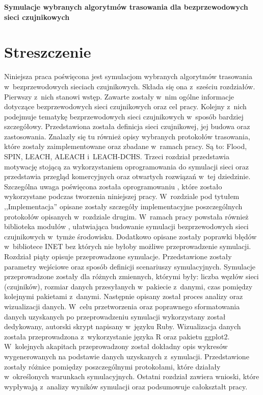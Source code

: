 \newpage
\begin{center}
\large \bf
Symulacje wybranych algorytmów trasowania dla bezprzewodowych sieci czujnikowych
\end{center}

\section*{Streszczenie}
Niniejsza praca poświęcona jest symulacjom wybranych algorytmów trasowania w~bezprzewodowych sieciach czujnikowych. Składa się ona z~sześciu rozdziałów. Pierwszy z~nich stanowi wstęp. Zawarte zostały w~nim ogólne informacje dotyczące bezprzewodowych sieci czujnikowych oraz cel pracy. Kolejny z~nich podejmuje tematykę bezprzewodowych sieci czujnikowych w~sposób bardziej szczegółowy. Przedstawiona została definicja sieci czujnikowej, jej budowa oraz zastosowania. Znalazły się tu również opisy wybranych protokołów trasowania, które zostały zaimplementowane oraz zbadane w~ramach pracy. Są to: Flood, SPIN, LEACH, ALEACH i~LEACH-DCHS. Trzeci rozdział przedstawia motywację stojącą za wykorzystaniem oprogramowania do symulacji sieci oraz przedstawia przegląd komercyjnych oraz otwartych rozwiązań w~tej dziedzinie. Szczególna uwaga poświęcona została oprogramowaniu \omnetpp, które zostało wykorzystane podczas tworzenia niniejszej pracy. W~rozdziale pod tytułem ,,Implementacja'' opisane zostały szczegóły implementacyjne poszczególnych protokołów opisanych w~rozdziale drugim. W~ramach pracy powstała również biblioteka modułów \omenetpp, ułatwiająca budowanie symulacji bezprzewodowych sieci czujnikowych w~tymże środowisku. Dodatkowo opisane zostały poprawki błędów w~bibliotece INET bez których nie byłoby możliwe przeprowadzenie symulacji. Rozdział piąty opisuje przeprowadzone symulacje. Przedstawione zostały parametry wejściowe oraz sposób definicji scenariuszy symulacyjnych. Symulacje przeprowadzone zostały dla różnych zmiennych, którymi były: liczba węzłów sieci (czujników), rozmiar danych przesyłanych w~pakiecie z~danymi, czas pomiędzy kolejnymi pakietami z~danymi. Następnie opisany został proces analizy oraz wizualizacji danych. W~celu przetworzenia oraz poprawnego sformatowania danych uzyskanych po przeprowadzeniu symulacji wykorzystany został dedykowany, autorski skrypt napisany w~języku Ruby. Wizualizacja danych została przeprowadzona z~wykorzystanie języka R oraz pakietu ggplot2. W~kolejnych akapitach przeprowadzony został dokładny opis wykresów wygenerowanych na podstawie danych uzyskanych z~symulacji. Przedstawione zostały różnice pomiędzy poszczególnymi protokołami, które działały w~określonych warunkach symulacyjnych. Ostatni rozdział zawiera wnioski, które wypływają z~analizy wyników symulacji oraz podsumowuje całokształt pracy.

